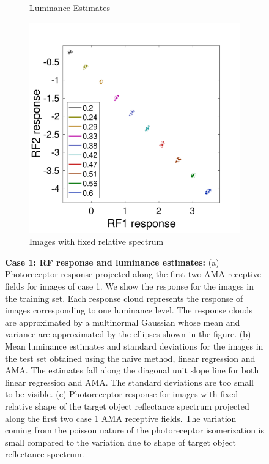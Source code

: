 \documentclass{jov}
\begin{document}
\begin{figure}
\begin{subfigure}[b]{0.297 \textwidth}
        \caption{Luminance Estimates}
        \label{fig:case9Results}
    \end{subfigure}    
        \begin{subfigure}[b]{0.3 \textwidth}
        \includegraphics[width=\textwidth]{../Figures/Figure9/Figure9_c.pdf}
        \caption{Images with fixed relative spectrum}
        \label{fig:case0RFResponse}
    \end{subfigure}
    \caption{{\bf Case 1: RF response and luminance estimates:} (a) Photoreceptor response projected along the first two AMA receptive fields for images of case 1. We show the response for the images in the training set. Each response cloud represents the response of images corresponding to one luminance level. The response clouds are approximated by a multinormal Gaussian whose mean and variance are approximated by the ellipses shown in the figure. (b) Mean luminance estimates and standard deviations for the images in the test set obtained using the naive method, linear regression and AMA. The estimates fall along the diagonal unit slope line for both linear regression and AMA. The standard deviations are too small to be visible. (c) Photoreceptor response for images with fixed relative shape of the target object reflectance spectrum projected along the first two case 1 AMA receptive fields. The variation coming from the poisson nature of the photoreceptor isomerization is small compared to the variation due to shape of target object reflectance spectrum.}
\label{fig:sourcesOfNoise}
\end{figure}
\end{document}
